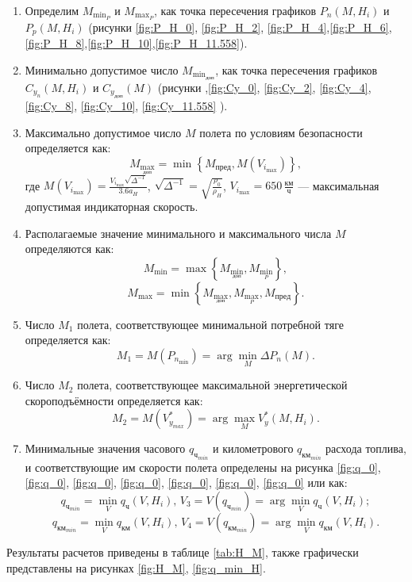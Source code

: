\begin{enumerate}
\item Определим $M_{{\min}_P}$ и $M_{{\max}_P}$, как точка пересечения
    графиков $P_n(M, H_i)$ и $P_p(M, H_i)$ (рисунки \ref{fig:P_H_0}, \ref{fig:P_H_2},
\ref{fig:P_H_4},\ref{fig:P_H_6},\ref{fig:P_H_8},\ref{fig:P_H_10},\ref{fig:P_H_11.558}).

\item Минимально допустимое число $M_{{\min}_{доп}}$, как точка пересечения
    графиков $C_{y_n}(M, H_i)$ и $C_{y_{доп}}(M)$ (рисунки
    ,\ref{fig:Cy_0}, \ref{fig:Cy_2}, \ref{fig:Cy_4}, \ref{fig:Cy_8},
    \ref{fig:Cy_10}, \ref{fig:Cy_11.558}
    ).
\item Максимально допустимое число $M$ полета по условиям безопасности 
        определяется как: 
    \[
        M_{{\max}_{доп}} = \min \left\{ M_{пред}, M(V_{i_{\max}}) \right\},
    \]
    где $M(V_{i_{\max}}) = \frac{V_{i_{\max}} \sqrt{\Delta^{-1}}}{3.6 a_H}$, 
    $\sqrt{\Delta^{-1}} = \sqrt{\frac{\rho_0}{\rho_H}}$, $V_{i_{\max}} = 650 \,
    \frac{км}{ч}$ --- максимальная допустимая индикаторная скорость.

\item Располагаемые значение минимального и максимального числа $M$
определяются как: 
\[
    M_{\min} = \max \left\{ M_{{\min}_{доп}}, M_{{\min}_P} \right\},
\]
\[
    M_{\max} = \min \left\{ M_{{\max}_{доп}}, M_{{\max}_P}, M_{пред} \right\}.
\]
\item Число $M_1$ полета, соответствующее минимальной потребной тяге
        определяется как:
        \[
            M_1 = M(P_{n_{\min}}) = \arg \min_{M} \Delta P_n (M).
        \]
\item Число $M_2$ полета, соответствующее максимальной энергетической скороподъёмности
определяется как:
        \[
            M_2 = M(V_{y_{max}}^*) = \arg \max_{M} V_y^* (M, H_i).
        \]
\item Минимальные значения часового $q_{ч_{min}}$ и километрового
        $q_{км_{min}}$ расхода топлива, и соответствующие им скорости полета
        определены на рисунка 
        \ref{fig:q_0}, \ref{fig:q_0}, \ref{fig:q_0}, \ref{fig:q_0}, \ref{fig:q_0}, \ref{fig:q_0}, \ref{fig:q_0}
        или как:
        \[
            q_{ч_{min}} = \min_V q_ч(V, H_i), \, V_3 = V(q_{ч_{min}}) =
            \arg \min_V q_ч (V, H_i);
        \]
        \[
            q_{{км}_{min}} = \min_V q_{км}(V, H_i), \, V_4 = V(q_{{км}_{min}}) =
            \arg \min_V q_{км} (V, H_i).
        \]
\end{enumerate}
Результаты расчетов приведены в таблице \ref{tab:H_M}, также графически представлены 
на рисунках \ref{fig:H_M}, \ref{fig:q_min_H}.

